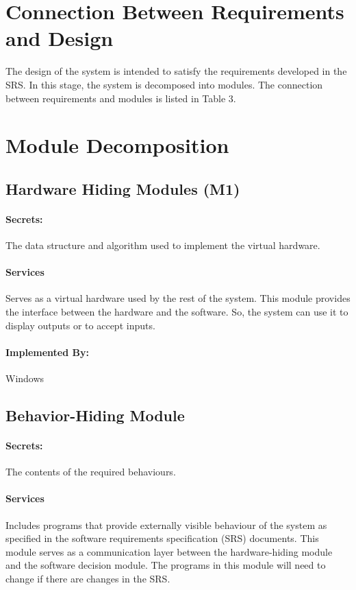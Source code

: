 \documentclass[12pt,letterpaper]{article}
\begin{document}
	\section{Connection Between Requirements and Design}
	The design of the system is intended to satisfy the requirements developed in the SRS. In this stage, the system is decomposed into modules. The connection between requirements and modules is listed in Table 3.

	\section{Module Decomposition}
	\subsection{Hardware Hiding Modules (M1)}
	\paragraph{Secrets: } The data structure and algorithm used to implement the virtual hardware.
	\paragraph{Services } Serves as a virtual hardware used by the rest of the system. This module provides the interface between the hardware and the software. So, the system can use it to display outputs or to accept inputs.
	\paragraph{Implemented By: } Windows

	\subsection{Behavior-Hiding Module}
	\paragraph{Secrets: } The contents of the required behaviours.
	\paragraph{Services }Includes programs that provide externally visible behaviour of the system as specified in the software requirements specification (SRS) documents. This module serves as a communication layer between the hardware-hiding module and the software decision module. The programs in this module will need to change if there are changes in the SRS.
\end{document}

